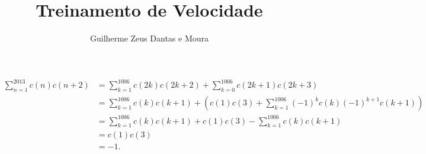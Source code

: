 \documentclass[11pt,a4paper]{article}
\title{Treinamento de Velocidade}
\author{Guilherme Zeus Dantas e Moura}
\begin{document}
	
	\zeustitle

	\begin{sol}
		\begin{align*}
			\sum_{n=1}^{2013} c(n)c(n+2) &= \sum_{k=1}^{1006}c(2k)c(2k+2) + \sum_{k=0}^{1006}c(2k+1)c(2k+3) \\
										 &= \sum_{k=1}^{1006}c(k)c(k+1) + \left( c(1)c(3) + \sum_{k=1}^{1006}(-1)^{k}c(k)(-1)^{k+1}c(k+1)\right) \\ 
										 &= \sum_{k=1}^{1006}c(k)c(k+1) + c(1)c(3) - \sum_{k=1}^{1006}c(k)c(k+1) \\ 
										 &= c(1)c(3)\\
										 &= -1.
		\end{align*}
	\end{sol}
\end{document}

